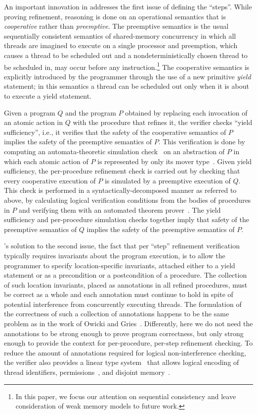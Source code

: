 An important innovation in \civl addresses the first issue of defining the ``steps''. While proving refinement,
reasoning is done on an operational semantics that is {\em cooperative\/} rather than {\em preemptive\/}.
The preemptive semantics is the usual sequentially consistent semantics of shared-memory concurrency in which all threads are imagined
to execute on a single processor and preemption, which causes a thread to be scheduled out and a nondeterministically chosen thread to 
be scheduled in, may occur before any instruction.\footnote{In this paper, 
we focus our attention on sequential consistency and leave consideration of weak memory models to future work.}
The cooperative semantics is explicitly introduced by the programmer through the use of a new primitive {\em yield\/} statement;
in this semantics a thread can be scheduled out only when it is about to execute a yield statement.

Given a program $Q$ and the program $P$ obtained by replacing each invocation of an atomic action in $Q$ 
with the procedure that refines it, the \civl verifier checks ``yield sufficiency'', i.e., it verifies that the safety of the cooperative semantics of $P$ implies the safety of the preemptive semantics of $P$.
This verification is done by computing an automata-theoretic simulation check~\cite{HenzingerHK95} 
on an abstraction of $P$ in which each atomic action of $P$ is represented by only its mover type~\cite{Lipton75,FlanaganFLQ08}. 
Given yield sufficiency, the per-procedure refinement check is carried out by checking that every cooperative execution of $P$ is simulated by a preemptive execution of $Q$.
This check is performed in a syntactically-decomposed manner as referred to above, by calculating logical verification conditions from the bodies of procedures in $P$ and 
verifying them with an automated theorem prover~\cite{MouraB08}.
The yield sufficiency and per-procedure simulation checks together imply that safety of the preemptive semantics of $Q$ implies the safety of the preemptive semantics of $P$.

\civl's solution to the second issue, the fact that per ``step'' refinement verification typically requires invariants about the program execution, is to allow the programmer to specify location-specific invariants, attached either to a yield statement
or as a precondition or a postcondition of a procedure. 
The collection of such location invariants, placed as annotations in all refined procedures, must be correct as a whole and each  annotation must continue to hold in spite of potential interference from concurrently executing threads.
The formulation of the correctness of such a collection of annotations happens to be the same problem as in the work of Owicki and Gries~\cite{OwickiG76}. Differently, here we do not need the annotations to be strong enough to prove program correctness, but only strong enough to provide the context for per-procedure, per-step refinement checking. 
To reduce the amount of annotations required for logical non-interference checking, 
the \civl verifier also provides a linear type system~\cite{Wadler90lineartypes} 
that allows logical encoding of thread identifiers, permissions~\cite{boyland:03fractions}, 
and disjoint memory~\cite{LahiriQW11}.

